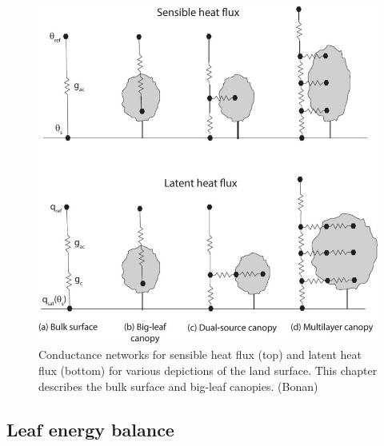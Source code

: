 \documentclass[
  oneside]{book}
\begin{document}
\begin{figure}

{\centering \includegraphics[width=0.8\linewidth]{figures/chap3/f330_E_balance} 

}

\caption{Conductance networks for sensible heat flux (top) and latent heat flux (bottom) for various depictions of the land surface. This chapter describes the bulk surface and big-leaf canopies. (Bonan)}\label{fig:f330}
\end{figure}

\hypertarget{leaf-energy-balance}{%
\subsection{Leaf energy balance}\label{leaf-energy-balance}}
\end{document}
